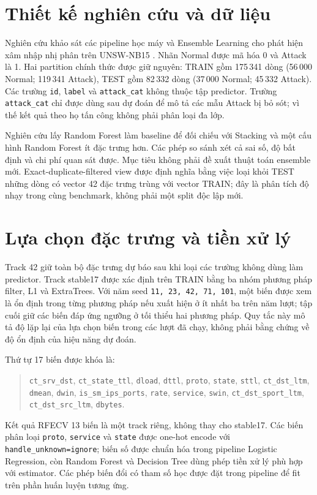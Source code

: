 \section{Thiết kế nghiên cứu và dữ liệu}
\label{sec:method-design}

Nghiên cứu khảo sát các pipeline học máy và Ensemble Learning cho phát hiện xâm nhập nhị phân trên UNSW-NB15 \cite{moustafa2015unsw}. Nhãn Normal được mã hóa 0 và Attack là 1. Hai partition chính thức được giữ nguyên: TRAIN gồm 175\,341 dòng (56\,000 Normal; 119\,341 Attack), TEST gồm 82\,332 dòng (37\,000 Normal; 45\,332 Attack). Các trường \texttt{id}, \texttt{label} và \texttt{attack\_cat} không thuộc tập predictor. Trường \texttt{attack\_cat} chỉ được dùng sau dự đoán để mô tả các mẫu Attack bị bỏ sót; vì thế kết quả theo họ tấn công không phải phân loại đa lớp.

Nghiên cứu lấy Random Forest làm baseline để đối chiếu với Stacking và một cấu hình Random Forest ít đặc trưng hơn. Các phép so sánh xét cả sai số, độ bất định và chi phí quan sát được. Mục tiêu không phải đề xuất thuật toán ensemble mới. Exact-duplicate-filtered view được định nghĩa bằng việc loại khỏi TEST những dòng có vector 42 đặc trưng trùng với vector TRAIN; đây là phân tích độ nhạy trong cùng benchmark, không phải một split độc lập mới.

\section{Lựa chọn đặc trưng và tiền xử lý}
\label{sec:method-feature-selection}

Track 42 giữ toàn bộ đặc trưng dự báo sau khi loại các trường không dùng làm predictor. Track stable17 được xác định trên TRAIN bằng ba nhóm phương pháp filter, L1 và ExtraTrees. Với năm seed \texttt{11, 23, 42, 71, 101}, một biến được xem là ổn định trong từng phương pháp nếu xuất hiện ở ít nhất ba trên năm lượt; tập cuối giữ các biến đáp ứng ngưỡng ở tối thiểu hai phương pháp. Quy tắc này mô tả độ lặp lại của lựa chọn biến trong các lượt đã chạy, không phải bằng chứng về độ ổn định của hiệu năng dự đoán.

Thứ tự 17 biến được khóa là:
\begin{quote}\small\raggedright
\texttt{ct\_srv\_dst}, \texttt{ct\_state\_ttl}, \texttt{dload}, \texttt{dttl},
\texttt{proto}, \texttt{state}, \texttt{sttl}, \texttt{ct\_dst\_ltm},
\texttt{dmean}, \texttt{dwin}, \texttt{is\_sm\_ips\_ports},
\texttt{rate}, \texttt{service}, \texttt{swin},
\texttt{ct\_dst\_sport\_ltm}, \texttt{ct\_dst\_src\_ltm}, \texttt{dbytes}.
\end{quote}
Kết quả RFECV 13 biến là một track riêng, không thay cho stable17. Các biến phân loại \texttt{proto}, \texttt{service} và \texttt{state} được one-hot encode với \texttt{handle\_unknown=ignore}; biến số được chuẩn hóa trong pipeline Logistic Regression, còn Random Forest và Decision Tree dùng phép tiền xử lý phù hợp với estimator. Các phép biến đổi có tham số học được đặt trong pipeline để fit trên phần huấn luyện tương ứng.

